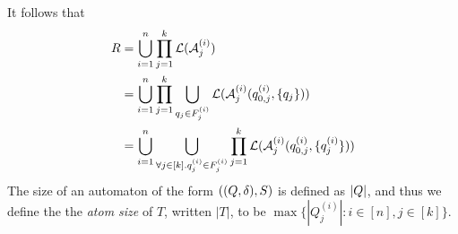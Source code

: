 It follows that 
%
\begin{align*}
R  & =   \bigcup_{i=1}^n \prod_{j=1}^k \mathcal{L}(\mathcal{A}^{(i)}_j) \\
& =   \bigcup_{i=1}^n  \prod_{j=1}^k \bigcup \limits_{q_j \in F^{(i)}_j} \mathcal{L}(\mathcal{A}^{(i)}_j(q^{(i)}_{0,j}, \{q_j\}))\\
&=	\bigcup \limits_{i=1}^n \bigcup \limits_{\forall j \in [k]. q^{(i)}_j \in F^{(i)}_j } \prod_{j=1}^k \mathcal{L}(\mathcal{A}^{(i)}_j(q^{(i)}_{0, j}, \{q^{(i)}_j\})) 
\end{align*}
%
%
%
The size of an automaton of the form $((Q, \delta), S)$ is defined as $|Q|$, and thus we define the 
the \emph{atom size} of $T$, written $|T|$,  to be $\max\{|Q_{j}^{(i)}|: i\in [n], j\in[k]\}$.


